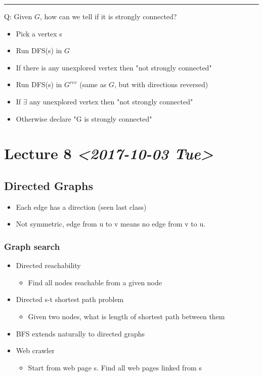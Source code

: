 \documentclass[11pt]{article}
\begin{document}
\noindent\rule{\textwidth}{0.5pt}
Q: Given \(G\), how can we tell if it is strongly connected?
\begin{itemize}
\item Pick a vertex s
\item Run DFS(s) in \(G\)
\item If there is any unexplored vertex then "not strongly connected"
\item Run DFS(s) in \(G^{rev}\) (same as \(G\), but with directions reversed)
\item If \(\exists\) any unexplored vertex then "not strongly connected"
\item Otherwise declare "G is strongly connected"
\end{itemize}
\section{Lecture 8 \textit{<2017-10-03 Tue>}}
\label{sec:org899bdd0}
\subsection{Directed Graphs}
\label{sec:org4f2580e}
\begin{itemize}
\item Each edge has a direction (seen last class)
\item Not symmetric, edge from u to v means no edge from v to u.
\end{itemize}
\subsubsection{Graph search}
\label{sec:org7c5b6c8}
\begin{itemize}
\item Directed reachability
\begin{itemize}
\item Find all nodes reachable from a given node
\end{itemize}
\item Directed s-t shortest path problem
\begin{itemize}
\item Given two nodes, what is length of shortest path between them
\end{itemize}
\item BFS extends naturally to directed graphs
\item Web crawler
\begin{itemize}
\item Start from web page s. Find all web pages linked from s
\end{itemize}
\end{itemize}
\end{document}
